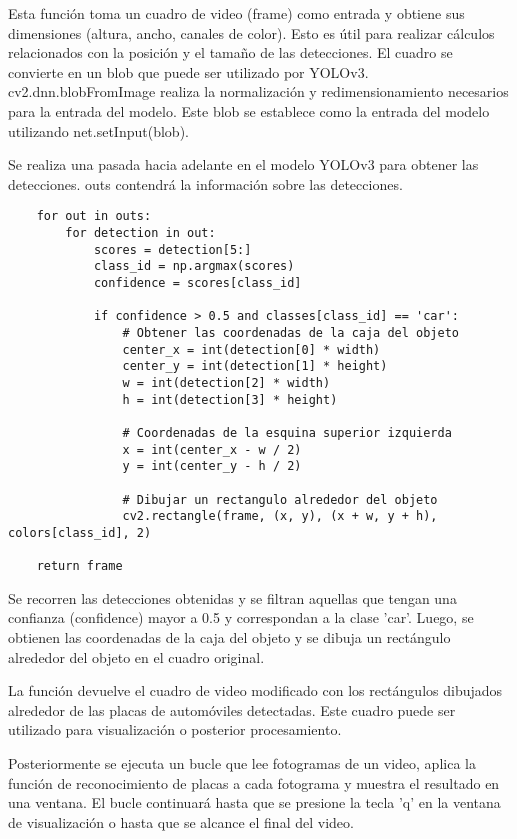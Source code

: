 \documentclass[a4paper,
               ]{jacow}
\begin{document}
Esta función toma un cuadro de video (frame) como entrada y obtiene sus dimensiones (altura, ancho, canales de color). Esto es útil para realizar cálculos relacionados con la posición y el tamaño de las detecciones. El cuadro se convierte en un blob que puede ser utilizado por YOLOv3. cv2.dnn.blobFromImage realiza la normalización y redimensionamiento necesarios para la entrada del modelo. Este blob se establece como la entrada del modelo utilizando net.setInput(blob).

Se realiza una pasada hacia adelante en el modelo YOLOv3 para obtener las detecciones. outs contendrá la información sobre las detecciones. 

\begin{lstlisting}
    for out in outs:
        for detection in out:
            scores = detection[5:]
            class_id = np.argmax(scores)
            confidence = scores[class_id]

            if confidence > 0.5 and classes[class_id] == 'car':
                # Obtener las coordenadas de la caja del objeto
                center_x = int(detection[0] * width)
                center_y = int(detection[1] * height)
                w = int(detection[2] * width)
                h = int(detection[3] * height)

                # Coordenadas de la esquina superior izquierda
                x = int(center_x - w / 2)
                y = int(center_y - h / 2)

                # Dibujar un rectangulo alrededor del objeto
                cv2.rectangle(frame, (x, y), (x + w, y + h), colors[class_id], 2)

    return frame
\end{lstlisting}

Se recorren las detecciones obtenidas y se filtran aquellas que tengan una confianza (confidence) mayor a 0.5 y correspondan a la clase 'car'. Luego, se obtienen las coordenadas de la caja del objeto y se dibuja un rectángulo alrededor del objeto en el cuadro original.

La función devuelve el cuadro de video modificado con los rectángulos dibujados alrededor de las placas de automóviles detectadas. Este cuadro puede ser utilizado para visualización o posterior procesamiento.

Posteriormente se ejecuta un bucle que lee fotogramas de un video, aplica la función de reconocimiento de placas a cada fotograma y muestra el resultado en una ventana. El bucle continuará hasta que se presione la tecla 'q' en la ventana de visualización o hasta que se alcance el final del video.
\end{document}
